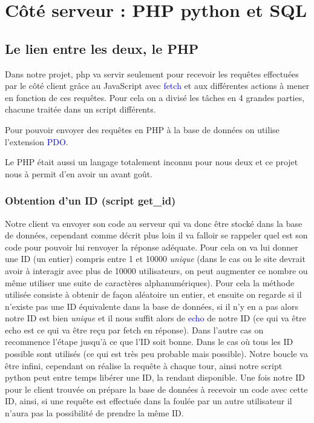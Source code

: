 \documentclass[a4paper]{article}
\renewcommand{\texttt}[2][blue]{\textcolor{#1}{\ttfamily #2}}
\begin{document}
\section{Côté serveur : PHP python et SQL}
\label{sec:serveur}

\subsection{Le lien entre les deux, le PHP}
\label{sec:PHP}

Dans notre projet, php va servir seulement pour recevoir les requêtes
effectuées par le côté client grâce au JavaScript avec \texttt{fetch} et aux
différentes actions à mener en fonction de ces requêtes. Pour cela on a divisé
les tâches en 4 grandes parties, chacune traitée dans un script différents.

Pour pouvoir envoyer des requêtes en PHP à la base de données on utilise
l'extension \texttt{PDO}.

Le PHP était aussi un langage totalement inconnu pour nous deux et ce projet
nous à permit d'en avoir un avant goût.

\subsubsection{Obtention d'un ID (script get\_id)}
\label{sub:get-id}

Notre client va envoyer son code au serveur qui va donc être stocké dans la
base de données, cependant comme décrit plus loin il va falloir se rappeler
quel est son code pour pouvoir lui renvoyer la réponse adéquate. Pour cela on
va lui donner une ID (un entier) compris entre 1 et 10000 \emph{unique} (dans
le cas ou le site devrait avoir à interagir avec plus de 10000 utilisateurs, on
peut augmenter ce nombre ou même utiliser une suite de caractères
alphanumériques). Pour cela la méthode utilisée consiste à obtenir de façon
aléatoire un entier, et ensuite on regarde si il n'existe pas une ID
équivalente dans la base de données, si il n'y en a pas alors notre ID est bien
\emph{unique} et il nous suffit alors de \texttt{echo} de notre ID (ce qui va
être echo est ce qui va être reçu par fetch en réponse). Dans l'autre cas on
recommence l'étape jusqu'à ce que l'ID soit bonne. Dans le cas où tous les ID
possible sont utilisés (ce qui est très peu probable mais possible). Notre
boucle va être infini, cependant on réalise la requête à chaque tour, ainsi
notre script python peut entre temps libérer une ID, la rendant disponible. Une
fois notre ID pour le client trouvée on prépare la base de données à recevoir un
code avec cette ID, ainsi, si une requête est effectuée dans la foulée par un
autre utilisateur il n'aura pas la possibilité de prendre la même ID.
\end{document}
